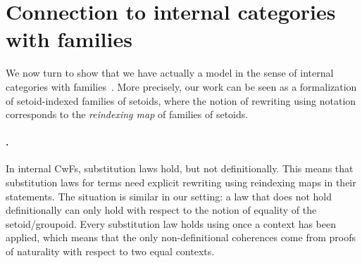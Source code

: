 
\begin{coqdoccode}
\coqdocemptyline
\coqdocemptyline
\end{coqdoccode}
\section{Connection to internal categories with families}


   \label{section:cwf}


  We now turn to show that we have actually a model in the sense of
  internal categories with families~\cite{dybjer:internaltt}. More
  precisely, our work can be seen as a formalization of setoid-indexed
  families of setoids, where the notion of rewriting using
  notation    corresponds to the \emph{reindexing
  map} of families of setoids.
\begin{coqdoccode}
\coqdocemptyline
\coqdocemptyline
\end{coqdoccode}
  \paragraph{.}


  In internal CwFs, substitution laws hold, but not definitionally. This
  means that substitution laws for terms need explicit rewriting using
  reindexing maps in their statements.  The situation is similar in our
  setting: a law that does not hold definitionally can only hold with
  respect to the notion of equality of the setoid/groupoid. Every
  substitution law holds using  once a context has been applied, 
  which means that the only non-definitional coherences come from proofs of 
  naturality with respect to two equal contexts.


